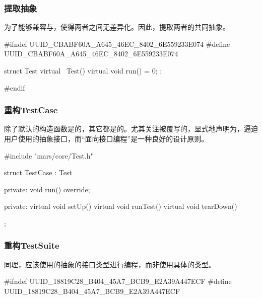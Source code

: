 \begin{content}
\subsubsection{提取抽象}

为了能够兼容与，使得两者之间无差异化。因此，提取两者的共同抽象。

\begin{leftbar}
 \begin{c++}[caption={\ttfamily{include/mars/core/Test.h}}]
#ifndef UUID_CBABF60A_A645_46EC_8402_6E559233E074
#define UUID_CBABF60A_A645_46EC_8402_6E559233E074

struct Test {
  virtual ~Test() {}
  virtual void run() = 0;
};

#endif
 \end{c++}
\end{leftbar}

\subsubsection{重构TestCase}

除了默认的构造函数是的，其它都是的。尤其关注被覆写的，显式地声明为，逼迫用户使用的抽象接口，而“面向接口编程”是一种良好的设计原则。

\begin{leftbar}
 \begin{c++}[caption={\ttfamily{include/mars/core/TestCase.h}}]
#include "mars/core/Test.h"

struct TestCase : Test {
private:
  void run() override;

private:
  virtual void setUp() {}
  virtual void runTest() {}
  virtual void tearDown() {}
};
 \end{c++}
\end{leftbar}

\subsubsection{重构TestSuite}

同理，应该使用的抽象的接口类型进行编程，而非使用具体的类型。

\begin{leftbar}
 \begin{c++}[caption={\ttfamily{include/mars/core/TestSuite.h}}]
#ifndef UUID_18819C28_B404_45A7_BCB9_E2A39A447ECF
#define UUID_18819C28_B404_45A7_BCB9_E2A39A447ECF


\end{c++}
\end{leftbar}
\end{content}
